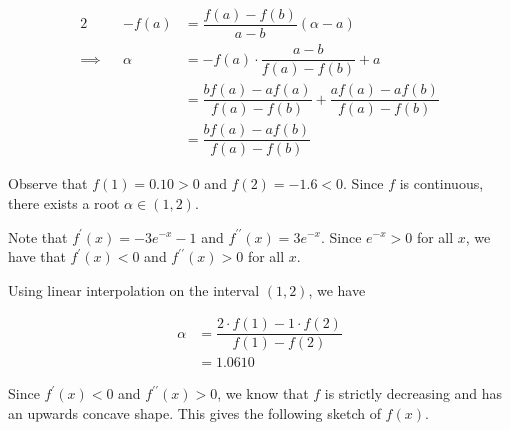 \documentclass{jhwhw}
\begin{document}
        \begin{alignat*}{2}
            &&-f(a) &= \dfrac{f(a) - f(b)}{a-b} (\alpha - a)\\
            \implies&&\alpha &= -f(a)\cdot\dfrac{a-b}{f(a) - f(b)} + a\\
            && &= \dfrac{bf(a) - af(a)}{f(a) - f(b)} + \dfrac{af(a)-af(b)}{f(a) - f(b)}\\
            && &= \dfrac{bf(a) - af(b)}{f(a) - f(b)}
        \end{alignat*}


        Observe that $f(1) = 0.10 > 0$ and $f(2) = -1.6 < 0$. Since $f$ is continuous, there exists a root $\alpha \in (1, 2)$.

        Note that $f^\prime(x) = -3e^{-x}-1$ and $f^{\prime\prime}(x) = 3e^{-x}$. Since $e^{-x} > 0$ for all $x$, we have that $f^\prime(x) < 0$ and $f^{\prime\prime}(x) > 0$ for all $x$.

        Using linear interpolation on the interval $(1, 2)$, we have

        \begin{equation*}
            \begin{aligned}
                \alpha &= \dfrac{2\cdot f(1) - 1 \cdot f(2)}{f(1) - f(2)} \\
                &= 1.0610
            \end{aligned}
        \end{equation*}


        Since $f^\prime(x) < 0$ and $f^{\prime\prime}(x) > 0$, we know that $f$ is strictly decreasing and has an upwards concave shape. This gives the following sketch of $f(x)$.
\end{document}
